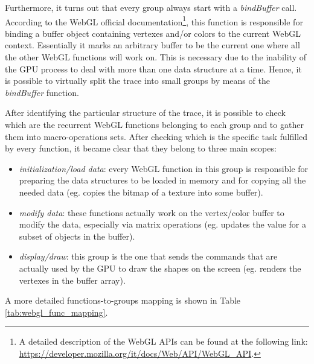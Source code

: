 Furthermore, it turns out that every group always start with a \emph{bindBuffer}
call. According to the WebGL official documentation\footnote{A detailed description
of the WebGL APIs can be found at the following link:
\url{https://developer.mozilla.org/it/docs/Web/API/WebGL_API}.}, this function is
responsible for binding a buffer object containing vertexes and/or colors to the
current WebGL context. Essentially it marks an arbitrary buffer to be the current
one where all the other WebGL functions will work on. This is necessary due to the
inability of the GPU process to deal with more than one data structure at a time. Hence,
it is possible to virtually split the trace into small groups by means of the
\emph{bindBuffer} function.

After identifying the particular structure of the trace, it is possible to check
which are the recurrent WebGL functions belonging to each group and to gather them into
macro-operations sets. After checking which is the specific task fulfilled by every
function, it became clear that they belong to three main scopes:
\begin{itemize}
    \item \emph{initialization/load data}: every WebGL function in this group
        is responsible for preparing the data structures to be loaded in memory
        and for copying all the needed data (eg. copies the bitmap of a texture
        into some buffer).
    \item \emph{modify data}: these functions actually work on the vertex/color
        buffer to modify the data, especially via matrix operations (eg. updates
        the value for a subset of objects in the buffer).
    \item \emph{display/draw}: this group is the one that sends the commands
        that are actually used by the GPU to draw the shapes on the screen
        (eg. renders the vertexes in the buffer array).
\end{itemize}

A more detailed functions-to-groups mapping is shown in Table
\ref{tab:webgl_func_mapping}.

